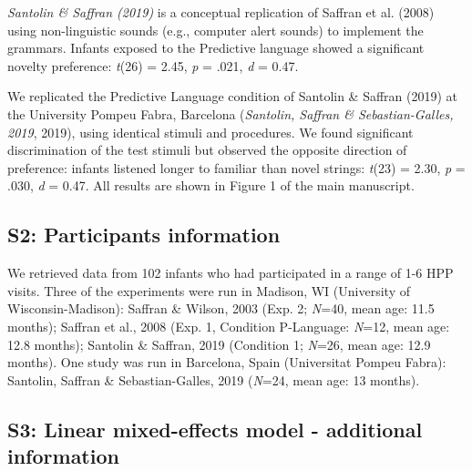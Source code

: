 \begin{appendix}
\emph{Santolin \& Saffran (2019)} is a conceptual replication of Saffran
et al. (2008) using non-linguistic sounds (e.g., computer alert sounds)
to implement the grammars. Infants exposed to the Predictive language
showed a significant novelty preference: \emph{t}(26) = 2.45, \emph{p} =
.021, \emph{d} = 0.47.

We replicated the Predictive Language condition of Santolin \& Saffran
(2019) at the University Pompeu Fabra, Barcelona (\emph{Santolin,
Saffran \& Sebastian-Galles, 2019}, 2019), using identical stimuli and
procedures. We found significant discrimination of the test stimuli but
observed the opposite direction of preference: infants listened longer
to familiar than novel strings: \emph{t}(23) = 2.30, \emph{p} = .030,
\emph{d} = 0.47. All results are shown in Figure 1 of the main
manuscript.

\hypertarget{s2}{%
\subsection{S2: Participants information}\label{s2}}

We retrieved data from 102 infants who had participated in a range of
1-6 HPP visits. Three of the experiments were run in Madison, WI
(University of Wisconsin-Madison): Saffran \& Wilson, 2003 (Exp. 2;
\emph{N}=40, mean age: 11.5 months); Saffran et al., 2008 (Exp. 1,
Condition P-Language: \emph{N}=12, mean age: 12.8 months); Santolin \&
Saffran, 2019 (Condition 1; \emph{N}=26, mean age: 12.9 months). One
study was run in Barcelona, Spain (Universitat Pompeu Fabra): Santolin,
Saffran \& Sebastian-Galles, 2019 (\emph{N}=24, mean age: 13 months).

\hypertarget{s3}{%
\subsection{S3: Linear mixed-effects model - additional
information}\label{s3}}


\end{appendix}
